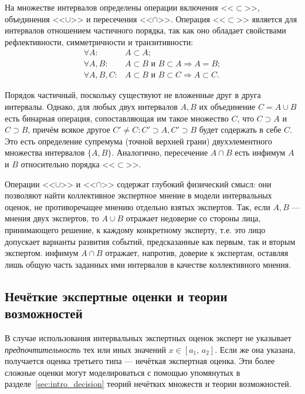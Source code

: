 На множестве интервалов определены операции включения <<$\subset$>>, объединения <<$\cup$>> и пересечения <<$\cap$>>. Операция 
<<$\subset$>> является для интервалов отношением частичного порядка, так как оно обладает свойствами рефлективности, симметричности и транзитивности:
\begin{equation}
\label{interv_order}
\begin{split}
\forall A: & A \subset A; \\
\forall A, B: & A \subset B \text{ и } B \subset A \Rightarrow A = B; \\
\forall A, B, C: & A \subset B \text{ и } B \subset C \Rightarrow A \subset C.
\end{split}
\end{equation}

Порядок частичный, поскольку существуют не вложенные друг в друга интервалы. Однако, для любых двух интервалов $A, B$ их объединение $C = A \cup B$ есть бинарная операция, сопоставляющая им такое множество $C$, что $C \supset A$ и $C \supset B$, причём всякое другое $C' \neq C: C' \supset A, C' \supset B$ будет содержать в себе $C$. Это есть определение супремума (точной верхней грани) двухэлементного множества интервалов $\{A, B\}$. %
Аналогично, пересечение $A \cap B$ есть инфимум $A$ и $B$ относительно порядка <<$\subset$>>.

Операции <<$\cup$>> и <<$\cap$>> содержат глубокий физический смысл: они позволяют найти коллективное экспертное мнение в модели интервальных оценок, не противоречащее мнению отдельно взятых экспертов. Так, если $A, B$ --- мнения двух экспертов, то $A \cup B$ отражает недоверие со стороны лица, принимающего решение, к каждому конкретному эксперту, т.е. это лицо допускает варианты развития событий, предсказанные как первым, так и вторым экспертом. инфимум  $A \cap B$ отражает, напротив, доверие к экспертам, оставляя лишь общую часть заданных ими интервалов в качестве коллективного мнения.

\subsection{Нечёткие экспертные оценки и теории возможностей}

В случае использования интервальных экспертных оценок эксперт не указывает {\sl предпочтительность} тех или иных значений $x \in [a_1,\, a_2]$. Если же она указана, получается оценка третьего типа --- нечёткая экспертная оценка. Эти более сложные оценки могут моделироваться с помощью упомянутых в разделе~\ref{sec:intro_decision} теорий нечётких множеств и теории возможностей.

